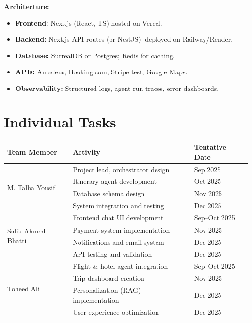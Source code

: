 \documentclass[12pt,a4paper]{article}
\begin{document}
\textbf{Architecture:}

\begin{itemize}
\item \textbf{Frontend:} Next.js (React, TS) hosted on Vercel.
\item \textbf{Backend:} Next.js API routes (or NestJS), deployed on Railway/Render.
\item \textbf{Database:} SurrealDB or Postgres; Redis for caching.
\item \textbf{APIs:} Amadeus, Booking.com, Stripe test, Google Maps.
\item \textbf{Observability:} Structured logs, agent run traces, error dashboards.
\end{itemize}

\section{Individual Tasks }

\begin{table}[H]
\centering
\begin{tabular}{|p{4cm}|p{8cm}|p{3cm}|}
\hline
\textbf{Team Member} & \textbf{Activity} & \textbf{Tentative Date} \\
\hline
\multirow{4}{*}{M. Talha Yousif} & Project lead, orchestrator design & Sep 2025 \\
\cline{2-3}
& Itinerary agent development & Oct 2025 \\
\cline{2-3}
& Database schema design & Nov 2025 \\
\cline{2-3}
& System integration and testing & Dec 2025 \\
\hline
\multirow{4}{*}{Salik Ahmed Bhatti}
& Frontend chat UI development & Sep–Oct 2025 \\
\cline{2-3}

& Payment system implementation & Nov 2025 \\
\cline{2-3}
& Notifications and email system & Dec 2025 \\
\cline{2-3}
& API testing and validation & Dec 2025 \\
\hline
\multirow{4}{*}{Toheed Ali} 
& Flight \& hotel agent integration & Sep–Oct 2025 \\
\cline{2-3}
& Trip dashboard creation & Nov 2025 \\
\cline{2-3}
& Personalization (RAG) implementation & Dec 2025 \\
\cline{2-3}
& User experience optimization & Dec 2025 \\
\hline
\end{tabular}
\end{table}
\end{document}
